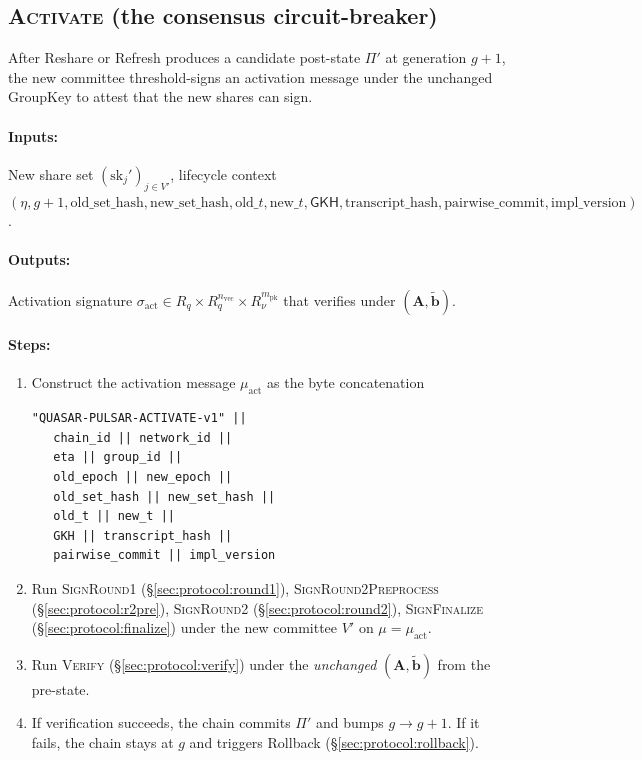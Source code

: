 \subsection{\textsc{Activate} (the consensus circuit-breaker)}
\label{sec:protocol:activate}

After Reshare or Refresh produces a candidate post-state $\Pi'$ at
generation $g+1$, the new committee threshold-signs an activation
message under the unchanged GroupKey to attest that the new shares can
sign.

\paragraph{Inputs:} New share set
$(\mathrm{sk}_j')_{j \in V'}$, lifecycle context $(\eta, g+1,
\mathrm{old\_set\_hash}, \mathrm{new\_set\_hash},
\mathrm{old}\_t, \mathrm{new}\_t,
\mathsf{GKH}, \mathrm{transcript\_hash},
\mathrm{pairwise\_commit}, \mathrm{impl\_version})$.

\paragraph{Outputs:} Activation signature $\sigma_{\mathrm{act}} \in
R_q \times R_q^{n_{\mathrm{vec}}} \times R_\nu^{m_{\mathrm{pk}}}$ that
verifies under $(\mathbf{A}, \tilde{\mathbf{b}})$.

\paragraph{Steps:}
\begin{enumerate}[leftmargin=2em, nosep]
\item Construct the activation message
      $\mu_{\mathrm{act}}$ as the byte concatenation
      \begin{verbatim}
"QUASAR-PULSAR-ACTIVATE-v1" ||
   chain_id || network_id ||
   eta || group_id ||
   old_epoch || new_epoch ||
   old_set_hash || new_set_hash ||
   old_t || new_t ||
   GKH || transcript_hash ||
   pairwise_commit || impl_version
      \end{verbatim}
\item Run \textsc{SignRound1} (\S\ref{sec:protocol:round1}),
      \textsc{SignRound2Preprocess} (\S\ref{sec:protocol:r2pre}),
      \textsc{SignRound2} (\S\ref{sec:protocol:round2}),
      \textsc{SignFinalize} (\S\ref{sec:protocol:finalize}) under the
      new committee $V'$ on $\mu = \mu_{\mathrm{act}}$.
\item Run \textsc{Verify} (\S\ref{sec:protocol:verify}) under the
      \emph{unchanged} $(\mathbf{A}, \tilde{\mathbf{b}})$ from the
      pre-state.
\item If verification succeeds, the chain commits $\Pi'$ and bumps
      $g \to g+1$. If it fails, the chain stays at $g$ and triggers
      Rollback (\S\ref{sec:protocol:rollback}).
\end{enumerate}


